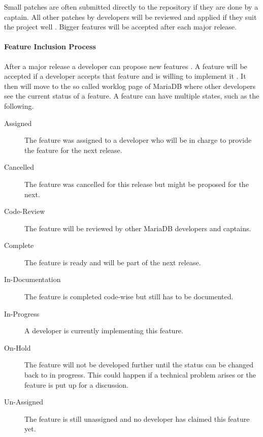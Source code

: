 Small patches are often submitted directly to the repository if they are done
by a captain. All other patches by developers will be reviewed and applied if
they suit the project well \cite{MySQLRoadmap,MySQLPlans}. Bigger features will
be accepted after each major release.

\paragraph{Feature Inclusion Process}

After a major release a developer can propose new features \cite{MySQLPlans}. A
feature will be accepted if a developer accepts that feature and is willing to
implement it \cite{MySQLContributingCode,MySQLContributing}. It then will move
to the so called worklog page of MariaDB where other developers see the current
status of a feature. A feature can have multiple states, such as the following.

\begin{description}

  \item[Assigned] The feature was assigned to a developer who will be in charge
    to provide the feature for the next release.

  \item[Cancelled] The feature was cancelled for this release but might
    be proposed for the next.

  \item[Code-Review] The feature will be reviewed by other MariaDB
    developers and captains.

  \item[Complete] The feature is ready and will be part of the next
    release.

  \item[In-Documentation] The feature is completed code-wise but still
    has to be documented.

  \item[In-Progress] A developer is currently implementing this feature.

  \item[On-Hold] The feature will not be developed further until the
    status can be changed back to in progress. This could happen if a
    technical problem arises or the feature is put up for a discussion.

  \item[Un-Assigned] The feature is still unassigned and no developer has
    claimed this feature yet.

\end{description}


